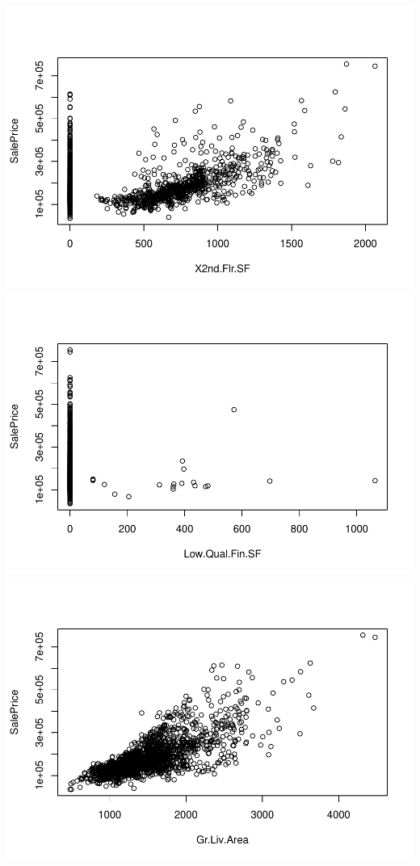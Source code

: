 \documentclass[
]{article}
\begin{document}
\includegraphics{Predicting-Housing-Price_files/figure-latex/unnamed-chunk-2-13.pdf}
\includegraphics{Predicting-Housing-Price_files/figure-latex/unnamed-chunk-2-14.pdf}
\includegraphics{Predicting-Housing-Price_files/figure-latex/unnamed-chunk-2-15.pdf}
\end{document}
